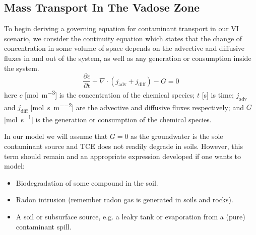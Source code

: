 \subsection{Mass Transport In The Vadose Zone}\label{sec:transport}

To begin deriving a governing equation for contaminant transport in our VI scenario, we consider the continuity equation which states that the change of concentration in some volume of space depends on the advective and diffusive fluxes in and out of the system, as well as any generation or consumption inside the system.
\begin{equation}
  \frac{\partial c}{\partial t} + \nabla \cdot(j_\mathrm{adv} + j_\mathrm{diff}) - G = 0
\end{equation}
here $c$ [\si{\mol\per\metre\cubed}] is the concentration of the chemical species;
$t$ [\si{\second}] is time;
$j_\mathrm{adv}$ and $j_\mathrm{diff}$ [\si{\mol\per\second\per\metre\squared}] are the advective and diffusive fluxes respectively;
and $G$ [\si{\mol\per\second}] is the generation or consumption of the chemical species.\par

In our model we will assume that $G = 0$ as the groundwater is the sole contaminant source and TCE does not readily degrade in soils. %
However, this term should remain and an appropriate expression developed if one wants to model:
\begin{itemize}
  \item Biodegradation of some compound in the soil.
  \item Radon intrusion (remember radon gas is generated in soils and rocks).
  \item A soil or subsurface source, e.g. a leaky tank or evaporation from a (pure) contaminant spill.
\end{itemize}\par

